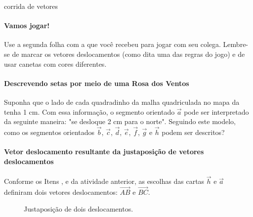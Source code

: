 \begin{task}{ corrida de vetores}
\paragraph{Vamos jogar!}

Use a segunda folha com a \hyperref[\detokenize{GE101-0A:fig-geometria-cv-02}]{} que você recebeu para jogar com seu colega. Lembre-se de marcar os vetores deslocamentos (como dita uma das regras do jogo) e de usar canetas com cores diferentes.

\paragraph{Descrevendo setas por meio de uma Rosa dos Ventos}

Suponha que o lado de cada quadradinho da malha quadriculada no mapa da \hyperref[\detokenize{GE101-0A:fig-geometria-cv-02}]{} tenha 1 cm.  Com essa informação, o segmento orientado \(\vec{a}\) pode ser interpretado da seguinte maneira: "se desloque 2 cm para o norte". Seguindo este modelo, como os segmentos orientados \(\vec{b}\), \(\vec{c}\), \(\vec{d}\), \(\vec{e}\), \(\vec{f}\), \(\vec{g}\) e \(\vec{h}\) podem ser descritos?
\end{task}





\paragraph{Vetor deslocamento resultante da justaposição de vetores deslocamentos}

Conforme os Itens ,  e  da atividade anterior, as escolhas das cartas \(\vec{h}\) e \(\vec{a}\) definiram dois vetores deslocamentos: \(\overrightarrow{AB}\) e \(\overrightarrow{BC}\).

\begin{figure}[H]
\centering
{}
\caption{Justaposição de dois deslocamentos.}
\label{fig-geometria-cv-06}
\end{figure}


